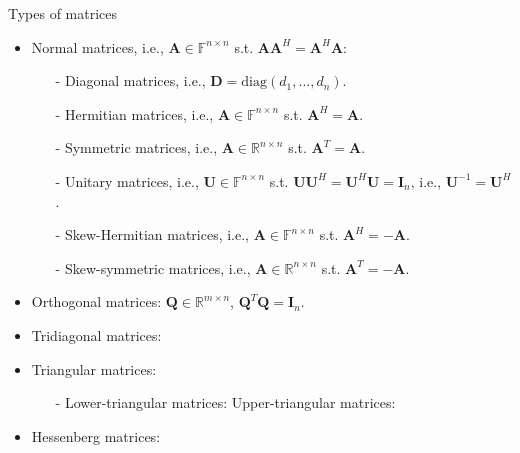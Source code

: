 \documentclass[t,usepdftitle=false]{beamer}
\begin{document}
\begin{frame}{Types of matrices}
\begin{itemize}
\item Normal matrices, i.e., $\mathbf{A}\in\mathbb{F}^{n\times n}$ s.t.$\!$ $\mathbf{A}\mathbf{A}^H = \mathbf{A}^H\mathbf{A}$:
\begin{itemize}
\item[-] Diagonal matrices, i.e., $\mathbf{D}=\mathrm{diag}(d_{1},\dots,d_{n})$.\vspace{.05cm}
\item[-] Hermitian matrices, i.e., $\mathbf{A}\in\mathbb{F}^{n\times n}$ s.t.$\!$   $\mathbf{A}^H = \mathbf{A}$.\vspace{.05cm}
\item[-] Symmetric matrices, i.e., $\mathbf{A}\in\mathbb{R}^{n\times n}$ s.t.$\!$   $\mathbf{A}^T = \mathbf{A}$.\vspace{.05cm}
\item[-] Unitary matrices, i.e., $\mathbf{U}\in\mathbb{F}^{n\times n}$ s.t.$\!$  $\mathbf{U} \mathbf{U}^H=\mathbf{U} ^H\mathbf{U} = \mathbf{I}_n$, i.e., $\mathbf{U}^{-1}=\mathbf{U}^H$.\vspace{.05cm}
\item[-] Skew-Hermitian matrices, i.e.,  $\mathbf{A}\in\mathbb{F}^{n\times n}$ s.t.$\!$  $\mathbf{A}^H = -\mathbf{A}$.\vspace{.05cm}
\item[-] Skew-symmetric matrices, i.e.,  $\mathbf{A}\in\mathbb{R}^{n\times n}$ s.t.$\!$  $\mathbf{A}^T = -\mathbf{A}$.
\end{itemize}
\item Orthogonal matrices: $\mathbf{Q}\in\mathbb{R}^{m\times n}$, $\mathbf{Q}^T\mathbf{Q}=\mathbf{I}_n$.\vspace{.1cm}
\item Tridiagonal matrices: 
\item Triangular matrices:\vspace{-.1cm}
\begin{itemize}
\item[-] Lower-triangular matrices: 
\hspace{1cm}{\color{blue}-} Upper-triangular matrices: 
\end{itemize}
\item Hessenberg matrices:
\begin{itemize}

\end{itemize}
\end{itemize}
\end{frame}
\end{document}
